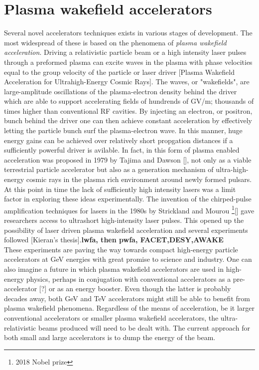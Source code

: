 \section{Plasma wakefield accelerators}\vspace{-8pt}
Several novel accelerators techniques exists in various stages of development. The most widespread of these is based on the phenomena of \textit{plasma wakefield acceleration}. Driving a relativistic particle beam or a high intensity laser pulses through a preformed plasma can excite waves in the plasma with phase velocities equal to the group velocity of the particle or laser driver [Plasma Wakefield Acceleration for Ultrahigh-Energy Cosmic Rays]. The waves, or "wakefields", are large-amplitude oscillations of the plasma-electron density behind the driver which are able to support accelerating fields of hundrends of GV/m; thousands of times higher than conventional RF cavities. By injecting an electron, or positron, bunch behind the driver one can then achieve constant acceleration by effectively letting the particle bunch surf the plasma-electron wave. In this manner, huge energy gains can be achieved over relatively short propgation distances if a sufficiently powerful driver is avilable. In fact, in this form of plasma enabled acceleration was proposed in 1979 by Tajima and Dawson [], not only as a viable terrestrial particle accelerator but also as a generation mechanism of ultra-high-energy cosmic rays in the plasma rich environment around newly formed pulsars. At this point in time the lack of sufficiently high intensity lasers was a limit factor in exploring these ideas experimentally. The invention of the chirped-pulse amplification techniques for lasers in the 1980s by Strickland and Mourou \footnote{2018 Nobel prize }[] gave researchers access to ultrashort high-intensity laser pulses. This opened up the possibility of laser driven plasma wakefield acceleration and several experiments followed [Kieran's thesis].\textbf{lwfa, then pwfa, FACET,DESY,AWAKE}\\ 
These experiments are paving the way towards compact high-energy particle accelerators at GeV energies with great promise to science and industry. One can also imagine a future in which plasma wakefield accelerators are used in high-energy physics, perhaps in conjugation with conventional accelerators as a pre-accelerator [?] or as an energy booster. Even though the latter is probably decades away, both GeV and TeV accelerators might still be able to benefit from plasma wakefield phenomena. Regardless of the means of acceleration, be it larger conventional accelerators or smaller plasma wakefield accelerators, the ultra-relativistic beams produced will need to be dealt with. The current approach for both small and large accelerators is to dump the energy of the beam. \vspace{-8pt}
